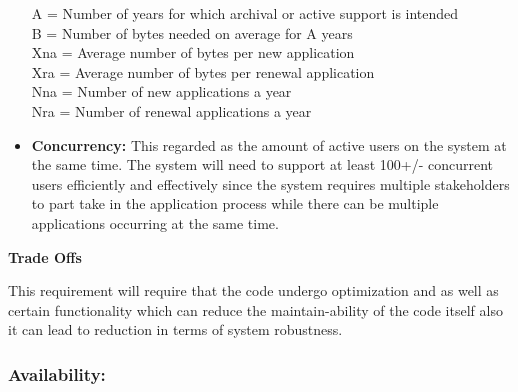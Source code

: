 \begin{flushleft}
\begin{itemize}
A = Number of years for which archival or active support is intended\\
B = Number of bytes needed on average for A years\\
Xna = Average number of bytes per new application\\
Xra = Average number of bytes per renewal application\\
Nna = Number of new applications a year\\
Nra = Number of renewal applications a year\\

\item\textbf{Concurrency:} This regarded as the amount of active users on the system at the same time.
The system will need to support at least 100+/- concurrent users efficiently and effectively since the system requires multiple stakeholders to part take in the application process while there can be multiple applications occurring at the same time.\\

\end{itemize}
\vspace{0.1in}

\textbf{Trade Offs}


This requirement will require that the code undergo optimization and as well as certain functionality which can reduce the maintain-ability of the code itself also it can lead to reduction in terms of system robustness.

\end{flushleft}
\vspace{0.1in}

\subsubsection{Availability:}

